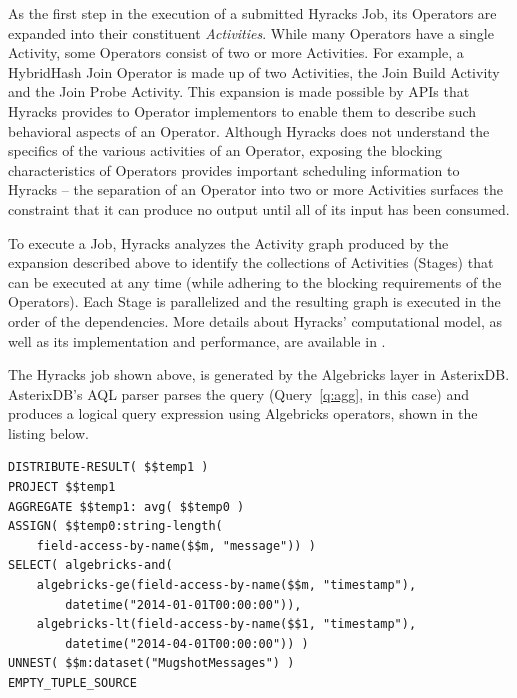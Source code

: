 As the first step in the execution of a submitted Hyracks Job, its Operators are expanded into their constituent \emph{Activities}. 
While many Operators have a single Activity, some Operators consist of two or more Activities.
For example, a HybridHash Join Operator is made up of two Activities, the Join Build Activity and the Join Probe Activity. 
This expansion is made possible by APIs that Hyracks provides to Operator implementors to enable them to describe such behavioral aspects of an Operator.
Although Hyracks does not understand the specifics of the various activities of an Operator, exposing the blocking characteristics of Operators provides important scheduling information to Hyracks -- the separation of an Operator into two or more Activities surfaces the constraint that it can produce no output until all of its input has been consumed.

To execute a Job, Hyracks analyzes the Activity graph produced by the expansion described above to identify the collections of Activities (Stages) that can be executed at any time (while adhering to the blocking requirements of the Operators). 
Each Stage is parallelized and the resulting graph is executed in the order of the dependencies. 
More details about Hyracks' computational model, as well as its implementation and performance, are available in \cite{hyracks}.

The Hyracks job shown above, is generated by the Algebricks layer in AsterixDB. AsterixDB's AQL parser parses the query (Query~\ref{q:agg}, in this case) and produces a logical query expression using Algebricks operators, shown in the listing below.

\lstset{numbers=left, numberstyle=\tiny, stepnumber=1, numbersep=5pt}
\begin{center}
\scriptsize
\begin{lstlisting}
DISTRIBUTE-RESULT( $$temp1 )
PROJECT $$temp1
AGGREGATE $$temp1: avg( $$temp0 )
ASSIGN( $$temp0:string-length(
    field-access-by-name($$m, "message")) )
SELECT( algebricks-and(
    algebricks-ge(field-access-by-name($$m, "timestamp"), 
        datetime("2014-01-01T00:00:00")), 
    algebricks-lt(field-access-by-name($$1, "timestamp"), 
        datetime("2014-04-01T00:00:00")) )
UNNEST( $$m:dataset("MugshotMessages") ) 
EMPTY_TUPLE_SOURCE
\end{lstlisting}
\end{center}

